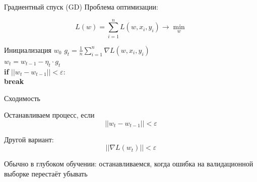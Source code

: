 \documentclass[notes,12pt, aspectratio=169]{beamer}
\newcommand{\pgr}[1]{{\color{green} \textbf{#1}}}
\newenvironment{wideitemize}{\itemize\addtolength{\itemsep}{10pt}}{\enditemize}
\begin{document}
\begin{frame}[fragile]{Градиентный спуск (GD)}
Проблема оптимизации: 

\[   
L(w) = \sum_{i=1}^n L(w, x_i, y_i) \to \min_{w}
\]

Инициализация $w_0$ 
\hspace{15pt} $g_t = \frac{1}{n}\sum_{i=1}^n  \nabla L(w, x_i, y_i)$ \\
\pgr{\hspace{15pt}} $w_t = w _{t-1} - \eta_t \cdot g_t $ \\
\pgr{\hspace{15pt} if} $||w_t - w_{t-1}|| < \varepsilon:$ \\
\pgr{\hspace{30pt} break}
\end{frame}


\begin{frame}[fragile]{Сходимость}

\begin{wideitemize}
\item Останавливаем процесс, если  $$ || w_t - w_{t-1}|| < \varepsilon $$

\item  Другой вариант: $$ || \nabla L(w_t) || < \varepsilon $$

\item Обычно в глубоком обучении: останавливаемся, когда ошибка на валидационной выборке перестаёт убывать 
\end{wideitemize}
\end{frame}
\end{document}
